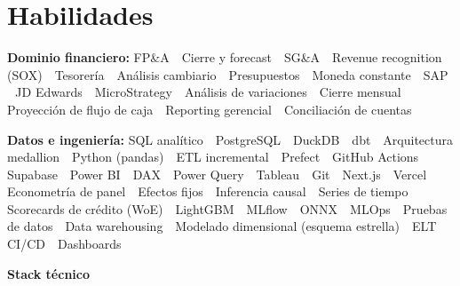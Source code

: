 \documentclass[a4paper,10pt]{article}
\begin{document}
\section*{Habilidades}
\textbf{\color{ink}Dominio financiero:} FP\&A \,\textperiodcentered\, Cierre y forecast \,\textperiodcentered\, SG\&A \,\textperiodcentered\, Revenue recognition (SOX) \,\textperiodcentered\, Tesorería \,\textperiodcentered\, Análisis cambiario \,\textperiodcentered\, Presupuestos \,\textperiodcentered\, Moneda constante \,\textperiodcentered\, SAP \,\textperiodcentered\, JD Edwards \,\textperiodcentered\, MicroStrategy \,\textperiodcentered\, Análisis de variaciones \,\textperiodcentered\, Cierre mensual \,\textperiodcentered\, Proyección de flujo de caja \,\textperiodcentered\, Reporting gerencial \,\textperiodcentered\, Conciliación de cuentas\par\vspace{3pt}
\textbf{\color{ink}Datos e ingeniería:} SQL analítico \,\textperiodcentered\, PostgreSQL \,\textperiodcentered\, DuckDB \,\textperiodcentered\, dbt \,\textperiodcentered\, Arquitectura medallion \,\textperiodcentered\, Python (pandas) \,\textperiodcentered\, ETL incremental \,\textperiodcentered\, Prefect \,\textperiodcentered\, GitHub Actions \,\textperiodcentered\, Supabase \,\textperiodcentered\, Power BI \,\textperiodcentered\, DAX \,\textperiodcentered\, Power Query \,\textperiodcentered\, Tableau \,\textperiodcentered\, Git \,\textperiodcentered\, Next.js \,\textperiodcentered\, Vercel \,\textperiodcentered\, Econometría de panel \,\textperiodcentered\, Efectos fijos \,\textperiodcentered\, Inferencia causal \,\textperiodcentered\, Series de tiempo \,\textperiodcentered\, Scorecards de crédito (WoE) \,\textperiodcentered\, LightGBM \,\textperiodcentered\, MLflow \,\textperiodcentered\, ONNX \,\textperiodcentered\, MLOps \,\textperiodcentered\, Pruebas de datos \,\textperiodcentered\, Data warehousing \,\textperiodcentered\, Modelado dimensional (esquema estrella) \,\textperiodcentered\, ELT \,\textperiodcentered\, CI/CD \,\textperiodcentered\, Dashboards\par\vspace{3pt}
\textbf{\color{ink}Stack técnico}\par\vspace{2pt}
\end{document}
